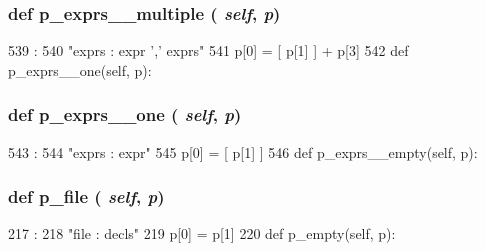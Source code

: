 \begin{DoxyVerb}
{\subsubsection[{p\_\-exprs\_\-\_\-multiple}]{\setlength{\rightskip}{0pt plus 5cm}def p\_\-exprs\_\-\_\-multiple ( {\em self}, \/   {\em p})}}
\label{classslicc_1_1parser_1_1SLICC_aca3f4f9507d6ed2ece13aaaaec53253d}



\begin{DoxyCode}
539                                   :
540         "exprs : expr ',' exprs"
541         p[0] = [ p[1] ] + p[3]
542 
    def p_exprs__one(self, p):
\end{DoxyCode}
\hypertarget{classslicc_1_1parser_1_1SLICC_a2a5be72f88e35eafedd318c800efae05}{
\subsubsection[{p\_\-exprs\_\-\_\-one}]{\setlength{\rightskip}{0pt plus 5cm}def p\_\-exprs\_\-\_\-one ( {\em self}, \/   {\em p})}}
\label{classslicc_1_1parser_1_1SLICC_a2a5be72f88e35eafedd318c800efae05}



\begin{DoxyCode}
543                              :
544         "exprs : expr"
545         p[0] = [ p[1] ]
546 
    def p_exprs__empty(self, p):
\end{DoxyCode}
\hypertarget{classslicc_1_1parser_1_1SLICC_ab7ba17cc0149c473abd251c9b96ceaf9}{
\subsubsection[{p\_\-file}]{\setlength{\rightskip}{0pt plus 5cm}def p\_\-file ( {\em self}, \/   {\em p})}}
\label{classslicc_1_1parser_1_1SLICC_ab7ba17cc0149c473abd251c9b96ceaf9}



\begin{DoxyCode}
217                        :
218         "file : decls"
219         p[0] = p[1]
220 
    def p_empty(self, p):
\end{DoxyCode}
\hypertarget{classslicc_1_1parser_1_1SLICC_afaf6fd2752bcbcfe7e4b38de1c128c99}{
}
\end{DoxyVerb}

